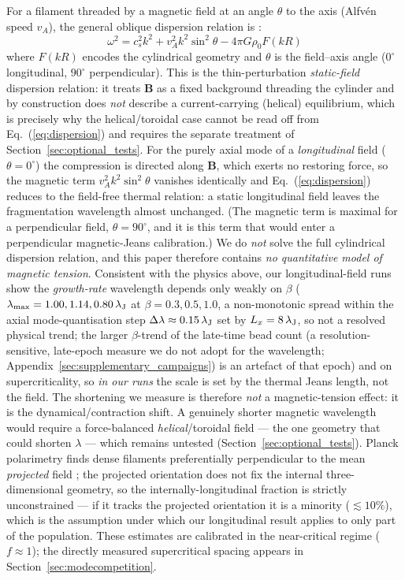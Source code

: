 \documentclass[usenatbib,twoside,twocolumn]{mnras}
\begin{document}
For a filament threaded by a magnetic field at an angle $\theta$ to the axis (Alfv\'en speed $v_A$), the general oblique dispersion relation is \citep{Nakamura1993}:
\begin{equation}
\omega^2 = c_s^2 k^2 + v_A^2 k^2 \sin^2\theta - 4\pi G\rho_0 F(kR)
\label{eq:dispersion}
\end{equation}
where $F(kR)$ encodes the cylindrical geometry and $\theta$ is the field--axis angle ($0^\circ$ longitudinal, $90^\circ$ perpendicular). This is the thin-perturbation \emph{static-field} dispersion relation: it treats $\mathbf{B}$ as a fixed background threading the cylinder and by construction does \emph{not} describe a current-carrying (helical) equilibrium, which is precisely why the helical/toroidal case cannot be read off from Eq.~(\ref{eq:dispersion}) and requires the separate treatment of Section~\ref{sec:optional_tests}. For the purely axial mode of a \emph{longitudinal} field ($\theta=0^\circ$) the compression is directed along $\mathbf{B}$, which exerts no restoring force, so the magnetic term $v_A^2k^2\sin^2\theta$ vanishes identically and Eq.~(\ref{eq:dispersion}) reduces to the field-free thermal relation: a static longitudinal field leaves the fragmentation wavelength almost unchanged. (The magnetic term is maximal for a perpendicular field, $\theta=90^\circ$, and it is this term that would enter a perpendicular magnetic-Jeans calibration.) We do \emph{not} solve the full cylindrical dispersion relation, and this paper therefore contains \emph{no quantitative model of magnetic tension}. Consistent with the physics above, our longitudinal-field runs show the \emph{growth-rate} wavelength depends only weakly on $\beta$ ($\lambda_{\rm max}=1.00,1.14,0.80\,\lambda_{\rm J}$ at $\beta=0.3,0.5,1.0$, a non-monotonic spread within the axial mode-quantisation step $\Delta\lambda\approx0.15\,\lambda_{\rm J}$ set by $L_x=8\,\lambda_{\rm J}$, so not a resolved physical trend; the larger $\beta$-trend of the late-time bead count (a resolution-sensitive, late-epoch measure we do not adopt for the wavelength; Appendix~\ref{sec:supplementary_campaigns}) is an artefact of that epoch) and on supercriticality, so \emph{in our runs} the scale is set by the thermal Jeans length, not the field. The shortening we measure is therefore \emph{not} a magnetic-tension effect: it is the dynamical/contraction shift. A genuinely shorter magnetic wavelength would require a force-balanced \emph{helical}/toroidal field --- the one geometry that could shorten $\lambda$ --- which remains untested (Section~\ref{sec:optional_tests}). Planck polarimetry finds dense filaments preferentially perpendicular to the mean \emph{projected} field \citep{Jadhav2026}; the projected orientation does not fix the internal three-dimensional geometry, so the internally-longitudinal fraction is strictly unconstrained --- if it tracks the projected orientation it is a minority ($\lesssim10\%$), which is the assumption under which our longitudinal result applies to only part of the population. These estimates are calibrated in the near-critical regime ($f\approx1$); the directly measured supercritical spacing appears in Section~\ref{sec:modecompetition}.
\end{document}
